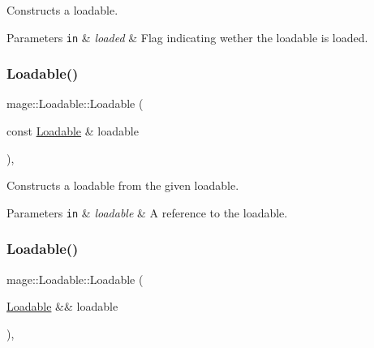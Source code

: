 Constructs a loadable.


\begin{DoxyParams}[1]{Parameters}
\mbox{\tt in}  & {\em loaded} & Flag indicating wether the loadable is loaded. \\
\hline
\end{DoxyParams}
\hypertarget{classmage_1_1_loadable_a21364449c045d579cb6090347d83cd54}{}\label{classmage_1_1_loadable_a21364449c045d579cb6090347d83cd54} 
\subsubsection{\texorpdfstring{Loadable()}{Loadable()}\hspace{0.1cm}{\footnotesize\ttfamily [2/3]}}
{\footnotesize\ttfamily mage\+::\+Loadable\+::\+Loadable (\begin{DoxyParamCaption}\item[{const \hyperlink{classmage_1_1_loadable}{Loadable} \&}]{loadable }\end{DoxyParamCaption})\hspace{0.3cm}{\ttfamily [protected]}, {\ttfamily [default]}}

Constructs a loadable from the given loadable.


\begin{DoxyParams}[1]{Parameters}
\mbox{\tt in}  & {\em loadable} & A reference to the loadable. \\
\hline
\end{DoxyParams}
\hypertarget{classmage_1_1_loadable_ad5f3daaaa4902fe285513408ec92b832}{}\label{classmage_1_1_loadable_ad5f3daaaa4902fe285513408ec92b832} 
\subsubsection{\texorpdfstring{Loadable()}{Loadable()}\hspace{0.1cm}{\footnotesize\ttfamily [3/3]}}
{\footnotesize\ttfamily mage\+::\+Loadable\+::\+Loadable (\begin{DoxyParamCaption}\item[{\hyperlink{classmage_1_1_loadable}{Loadable} \&\&}]{loadable }\end{DoxyParamCaption})\hspace{0.3cm}{\ttfamily [protected]}, {\ttfamily [default]}}


